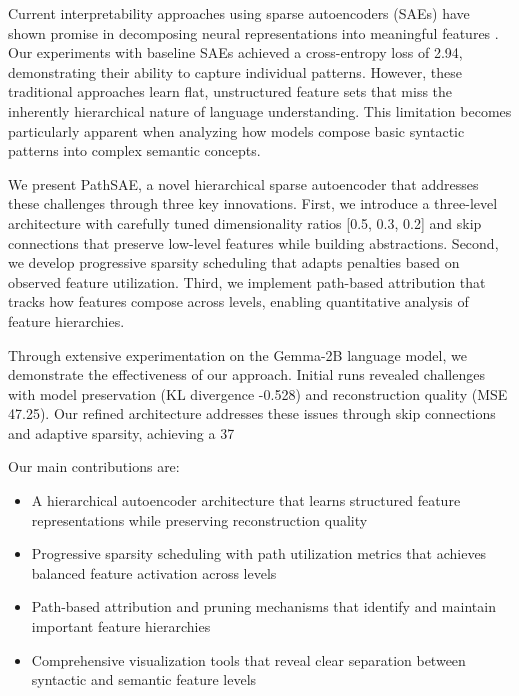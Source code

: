 \documentclass{article} %
\begin{document}
Current interpretability approaches using sparse autoencoders (SAEs) have shown promise in decomposing neural representations into meaningful features \cite{Li2024ConvergenceAF}. Our experiments with baseline SAEs achieved a cross-entropy loss of 2.94, demonstrating their ability to capture individual patterns. However, these traditional approaches learn flat, unstructured feature sets that miss the inherently hierarchical nature of language understanding. This limitation becomes particularly apparent when analyzing how models compose basic syntactic patterns into complex semantic concepts.

We present PathSAE, a novel hierarchical sparse autoencoder that addresses these challenges through three key innovations. First, we introduce a three-level architecture with carefully tuned dimensionality ratios [0.5, 0.3, 0.2] and skip connections that preserve low-level features while building abstractions. Second, we develop progressive sparsity scheduling that adapts penalties based on observed feature utilization. Third, we implement path-based attribution that tracks how features compose across levels, enabling quantitative analysis of feature hierarchies.

Through extensive experimentation on the Gemma-2B language model, we demonstrate the effectiveness of our approach. Initial runs revealed challenges with model preservation (KL divergence -0.528) and reconstruction quality (MSE 47.25). Our refined architecture addresses these issues through skip connections and adaptive sparsity, achieving a 37%

Our main contributions are:
\begin{itemize}
    \item A hierarchical autoencoder architecture that learns structured feature representations while preserving reconstruction quality
    \item Progressive sparsity scheduling with path utilization metrics that achieves balanced feature activation across levels
    \item Path-based attribution and pruning mechanisms that identify and maintain important feature hierarchies
    \item Comprehensive visualization tools that reveal clear separation between syntactic and semantic feature levels
\end{itemize}
\end{document}
